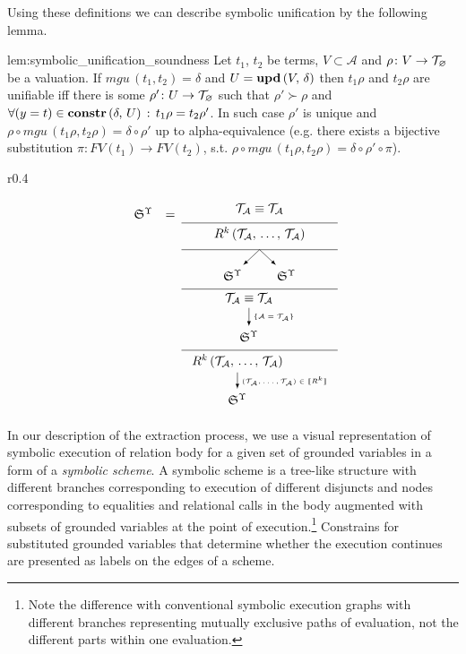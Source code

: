 Using these definitions we can describe symbolic unification by the following lemma.

\begin{replemma}{lem:symbolic_unification_soundness}
Let $t_1$, $t_2$ be terms,  $V \subset \mathcal{A}$ and $\rho \colon V \to \mathcal{T}_{\varnothing}$ be a valuation. If $mgu\,(t_1, t_2) = \delta$ and $U = \mbox{\textbf{upd}}\,(V,\, \delta) $  then $t_1 \rho$ and $t_2 \rho$ are unifiable iff there is some $\rho' \colon U \to \mathcal{T}_{\varnothing}$ such that $\rho' \succ \rho$ and $\forall (y = t) \in \mbox{\textbf{constr}}\,(\delta,\, U)\,:\, t_1 \rho = t_2 \rho'$.
In such case $\rho'$ is unique and $ \rho \circ mgu\,(t_1 \rho, t_2 \rho) = \delta\circ\rho' $ up to alpha-equivalence (e.g. there exists a bijective substitution $\pi : FV(t_1) \to FV(t_2)$, s.t. $ \rho \circ mgu\,(t_1 \rho, t_2 \rho) = \delta \circ\rho'\circ \pi$).
\end{replemma}

\begin{wrapfigure}{r}{0.4\textwidth}
\setlength{\belowcaptionskip}{-15pt plus 3pt minus 2pt}

\[\renewcommand{\arraystretch}{1}
\begin{array}{ccc}
  \schemewithvset{\mathfrak{S}}{\Upsilon} & = &\schemenode{$\unigoal{\mathcal{T}_\mathcal{A}}{\mathcal{T}_\mathcal{A}}$} \\ \cline{3-3}
                                          &   &\schemenode{$\invokegoal{R^k}{\mathcal{T}_\mathcal{A}}{\mathcal{T}_\mathcal{A}}$} \\ \cline{3-3}
                                          &   &\schemefork{$\schemewithvset{\mathfrak{S}}{\Upsilon}$}{$\schemewithvset{\mathfrak{S}}{\Upsilon}$} \\ \cline{3-3}
                                          &   &\schemesarrow{$\unigoal{\mathcal{T}_\mathcal{A}}{\mathcal{T}_\mathcal{A}}$}{$\{\mathcal{A}=\mathcal{T}_\mathcal{A}\}$}{$\schemewithvset{\mathfrak{S}}{\Upsilon}$}\\  \cline{3-3}
                                          &   &\schemedarrow{$\invokegoal{R^k}{\mathcal{T}_\mathcal{A}}{\mathcal{T}_\mathcal{A}}$}{$(\mathcal{T}_\mathcal{A}, \dots, \mathcal{T}_\mathcal{A}) \in \sembr{R^k}$}{$\schemewithvset{\mathfrak{S}}{\Upsilon}$} 
\end{array}\]
\caption{Symbolic Scheme Forms}
\label{fig:scheme_fragments}
\end{wrapfigure}

In our description of the extraction process, we use a visual representation of symbolic execution of relation body for a given set of grounded variables in a form of a \emph{symbolic scheme}.
A symbolic scheme is a tree-like structure with different branches corresponding to execution of different disjuncts and nodes corresponding to equalities and relational calls in the body
augmented with subsets of grounded variables at the point of execution.\footnote{Note the difference with conventional symbolic execution graphs
with different branches representing mutually exclusive paths of evaluation, not the different parts within one evaluation.} Constrains for substituted
grounded variables that determine whether the execution continues are presented as labels on the edges of a scheme.



